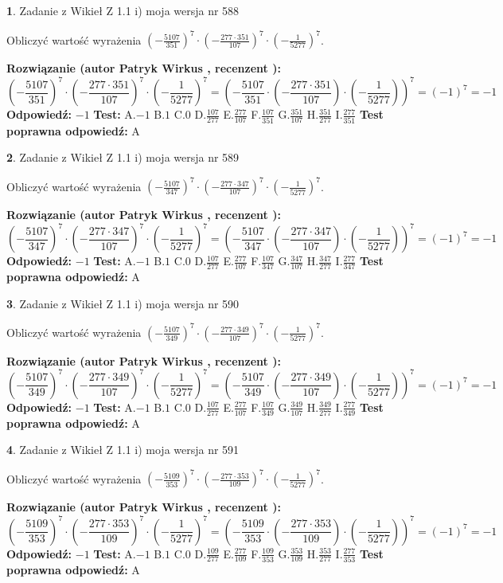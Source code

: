\documentclass[12pt, a4paper]{article}
\theoremstyle{definition} %
\newtheorem{zad}{}
\newcommand{\zadStart}[1]{\begin{zad}#1\newline}
\newcommand{\zadStop}{\end{zad}}
\newcommand{\rozwStart}[2]{\noindent \textbf{Rozwiązanie (autor #1 , recenzent #2): }\newline}
\newcommand{\rozwStop}{\newline}
\newcommand{\odpStart}{\noindent \textbf{Odpowiedź:}\newline}
\newcommand{\odpStop}{\newline}
\newcommand{\testStart}{\noindent \textbf{Test:}\newline}
\newcommand{\testStop}{\newline}
\newcommand{\kluczStart}{\noindent \textbf{Test poprawna odpowiedź:}\newline}
\newcommand{\kluczStop}{\newline}
\begin{document}
\zadStart{Zadanie z Wikieł Z 1.1 i) moja wersja nr 588}

Obliczyć wartość wyrażenia $(-\frac{5107}{351})^{7} \cdot (-\frac{277 \cdot 351}{107})^{7} \cdot (-\frac{1}{5277})^{7}$.
\zadStop
\rozwStart{Patryk Wirkus}{}
$$(-\frac{5107}{351})^{7} \cdot (-\frac{277 \cdot 351}{107})^{7} \cdot (-\frac{1}{5277})^{7} = (-\frac{5107}{351} \cdot (-\frac{277 \cdot 351}{107}) \cdot (-\frac{1}{5277}))^{7} = (-1)^{7} = -1$$
\rozwStop
\odpStart
$-1$
\odpStop
\testStart
A.$-1$ B.$1$ C.$0$ D.$\frac{107}{277}$ E.$\frac{277}{107}$
F.$\frac{107}{351}$ G.$\frac{351}{107}$
H.$\frac{351}{277}$
I.$\frac{277}{351}$
\testStop
\kluczStart
A
\kluczStop



\zadStart{Zadanie z Wikieł Z 1.1 i) moja wersja nr 589}

Obliczyć wartość wyrażenia $(-\frac{5107}{347})^{7} \cdot (-\frac{277 \cdot 347}{107})^{7} \cdot (-\frac{1}{5277})^{7}$.
\zadStop
\rozwStart{Patryk Wirkus}{}
$$(-\frac{5107}{347})^{7} \cdot (-\frac{277 \cdot 347}{107})^{7} \cdot (-\frac{1}{5277})^{7} = (-\frac{5107}{347} \cdot (-\frac{277 \cdot 347}{107}) \cdot (-\frac{1}{5277}))^{7} = (-1)^{7} = -1$$
\rozwStop
\odpStart
$-1$
\odpStop
\testStart
A.$-1$ B.$1$ C.$0$ D.$\frac{107}{277}$ E.$\frac{277}{107}$
F.$\frac{107}{347}$ G.$\frac{347}{107}$
H.$\frac{347}{277}$
I.$\frac{277}{347}$
\testStop
\kluczStart
A
\kluczStop



\zadStart{Zadanie z Wikieł Z 1.1 i) moja wersja nr 590}

Obliczyć wartość wyrażenia $(-\frac{5107}{349})^{7} \cdot (-\frac{277 \cdot 349}{107})^{7} \cdot (-\frac{1}{5277})^{7}$.
\zadStop
\rozwStart{Patryk Wirkus}{}
$$(-\frac{5107}{349})^{7} \cdot (-\frac{277 \cdot 349}{107})^{7} \cdot (-\frac{1}{5277})^{7} = (-\frac{5107}{349} \cdot (-\frac{277 \cdot 349}{107}) \cdot (-\frac{1}{5277}))^{7} = (-1)^{7} = -1$$
\rozwStop
\odpStart
$-1$
\odpStop
\testStart
A.$-1$ B.$1$ C.$0$ D.$\frac{107}{277}$ E.$\frac{277}{107}$
F.$\frac{107}{349}$ G.$\frac{349}{107}$
H.$\frac{349}{277}$
I.$\frac{277}{349}$
\testStop
\kluczStart
A
\kluczStop



\zadStart{Zadanie z Wikieł Z 1.1 i) moja wersja nr 591}

Obliczyć wartość wyrażenia $(-\frac{5109}{353})^{7} \cdot (-\frac{277 \cdot 353}{109})^{7} \cdot (-\frac{1}{5277})^{7}$.
\zadStop
\rozwStart{Patryk Wirkus}{}
$$(-\frac{5109}{353})^{7} \cdot (-\frac{277 \cdot 353}{109})^{7} \cdot (-\frac{1}{5277})^{7} = (-\frac{5109}{353} \cdot (-\frac{277 \cdot 353}{109}) \cdot (-\frac{1}{5277}))^{7} = (-1)^{7} = -1$$
\rozwStop
\odpStart
$-1$
\odpStop
\testStart
A.$-1$ B.$1$ C.$0$ D.$\frac{109}{277}$ E.$\frac{277}{109}$
F.$\frac{109}{353}$ G.$\frac{353}{109}$
H.$\frac{353}{277}$
I.$\frac{277}{353}$
\testStop
\kluczStart
A
\kluczStop
\end{document}
